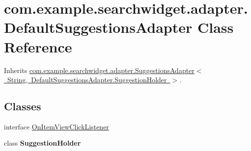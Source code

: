 \hypertarget{classcom_1_1example_1_1searchwidget_1_1adapter_1_1_default_suggestions_adapter}{}\section{com.\+example.\+searchwidget.\+adapter.\+Default\+Suggestions\+Adapter Class Reference}
\label{classcom_1_1example_1_1searchwidget_1_1adapter_1_1_default_suggestions_adapter}


Inherits \mbox{\hyperlink{classcom_1_1example_1_1searchwidget_1_1adapter_1_1_suggestions_adapter}{com.\+example.\+searchwidget.\+adapter.\+Suggestions\+Adapter$<$ String, Default\+Suggestions\+Adapter.\+Suggestion\+Holder $>$}}.

\subsection*{Classes}
\begin{DoxyCompactItemize}
\item 
interface \mbox{\hyperlink{interfacecom_1_1example_1_1searchwidget_1_1adapter_1_1_default_suggestions_adapter_1_1_on_item_view_click_listener}{On\+Item\+View\+Click\+Listener}}
\item 
class {\bfseries Suggestion\+Holder}
\end{DoxyCompactItemize}
